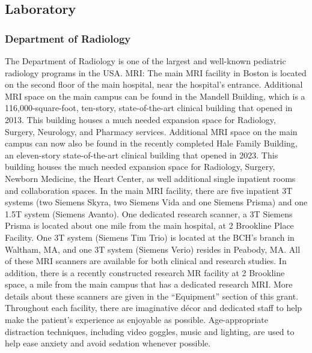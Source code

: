 \documentclass[11pt]{amsart}
\begin{document}
\hypertarget{x-laboratory}{\subsection*{Laboratory}}
\hypertarget{x-department-of-radiology}{\subsubsection*{Department of Radiology}}
The Department of Radiology is one of the largest and well-known pediatric radiology programs in the USA. MRI: The main MRI facility in Boston is located on the second floor of the main hospital, near the hospital’s entrance. Additional MRI space on the main campus can be found in the Mandell Building, which is a 116,000-square-foot, ten-story, state-of-the-art clinical building that opened in 2013. This building houses a much needed expansion space for Radiology, Surgery, Neurology, and Pharmacy services. Additional MRI space on the main campus can now also be found in the recently completed Hale Family Building, an eleven-story state-of-the-art clinical building that opened in 2023. This building houses the much needed expansion space for Radiology, Surgery, Newborn Medicine, the Heart Center, as well additional single inpatient rooms and collaboration spaces. In the main MRI facility, there are five inpatient 3T systems (two Siemens Skyra, two Siemens Vida and one Siemens Prisma) and one 1.5T system (Siemens Avanto). One dedicated research scanner, a 3T Siemens Prisma is located about one mile from the main hospital, at 2 Brookline Place Facility. One 3T system (Siemens Tim Trio) is located at the BCH’s branch in Waltham, MA, and one 3T system (Siemens Verio) resides in Peabody, MA. All of these MRI scanners are available for both clinical and research studies. In addition, there is a recently constructed research MR facility at 2 Brookline space, a mile from the main campus that has a dedicated research MRI. More details about these scanners are given in the “Equipment” section of this grant. Throughout each facility, there are imaginative décor and dedicated staff to help make the patient’s experience as enjoyable as possible. Age-appropriate distraction techniques, including video goggles, music and lighting, are used to help ease anxiety and avoid sedation whenever possible.
\end{document}
